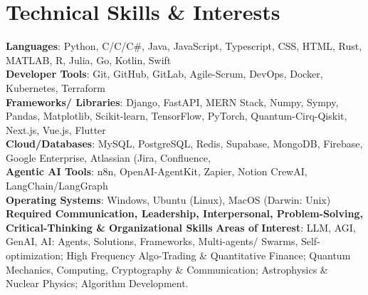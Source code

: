 \documentclass[a4paper,11pt]{article}
\begin{document}
\section{\textbf{Technical Skills \& Interests}}
 \begin{itemize}[leftmargin=0.05in, label={}]
    \small{\item{
     \textbf{Languages}{: } Python, C/C\+\+/C\#, Java, JavaScript, Typescript, CSS, HTML, Rust, MATLAB, R, Julia, Go, Kotlin, Swift \\
     \textbf{Developer Tools}{: } Git, GitHub, GitLab, Agile-Scrum, DevOps, Docker, Kubernetes, Terraform \\
     \textbf{Frameworks/ Libraries}{: } Django, FastAPI, MERN Stack, Numpy, Sympy, Pandas, Matplotlib, Scikit-learn, TensorFlow, PyTorch, Quantum-Cirq-Qiskit, Next.js, Vue.js, Flutter \\
     \textbf{Cloud/Databases}{: } MySQL, PostgreSQL, Redis, Supabase, MongoDB, Firebase, Google Enterprise, Atlassian (Jira, Confluence,  \\
     \textbf{Agentic AI Tools}{: } n8n, OpenAI-AgentKit, Zapier, Notion CrewAI, LangChain/LangGraph \\
     \textbf{Operating Systems}{: } Windows, Ubuntu (Linux), MacOS (Darwin: Unix) \\
     \textbf{Required Communication, Leadership, Interpersonal, Problem-Solving, Critical-Thinking \& Organizational Skills}
     \textbf{Areas of Interest}{: } LLM, AGI, GenAI, AI: Agents, Solutions, Frameworks, Multi-agents/ Swarms, Self-optimization; High Frequency Algo-Trading \& Quantitative Finance; Quantum Mechanics, Computing, Cryptography \& Communication; Astrophysics \& Nuclear Physics; Algorithm Development.
    }}
 \end{itemize}
 \vspace{-16pt}



\end{document}

